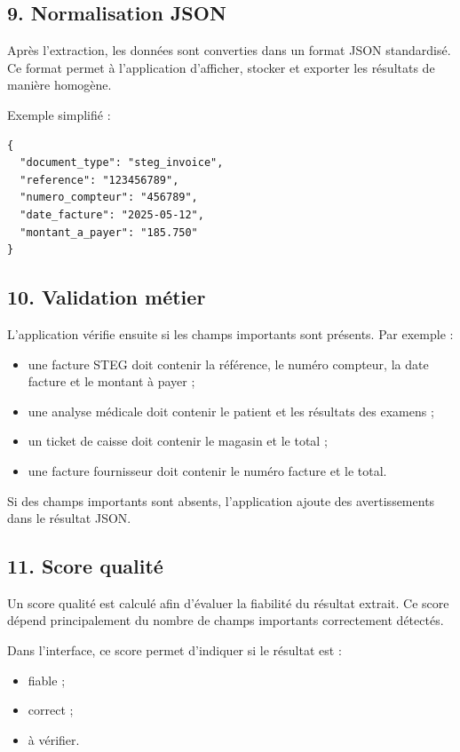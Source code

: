 \documentclass[12pt,a4paper]{report}
\begin{document}
\subsection*{9. Normalisation JSON}

Après l'extraction, les données sont converties dans un format JSON standardisé. Ce format permet à l'application d'afficher, stocker et exporter les résultats de manière homogène.

Exemple simplifié :

\begin{verbatim}
{
  "document_type": "steg_invoice",
  "reference": "123456789",
  "numero_compteur": "456789",
  "date_facture": "2025-05-12",
  "montant_a_payer": "185.750"
}
\end{verbatim}

\subsection*{10. Validation métier}

L'application vérifie ensuite si les champs importants sont présents. Par exemple :

\begin{itemize}
    \item une facture STEG doit contenir la référence, le numéro compteur, la date facture et le montant à payer ;
    \item une analyse médicale doit contenir le patient et les résultats des examens ;
    \item un ticket de caisse doit contenir le magasin et le total ;
    \item une facture fournisseur doit contenir le numéro facture et le total.
\end{itemize}

Si des champs importants sont absents, l'application ajoute des avertissements dans le résultat JSON.

\subsection*{11. Score qualité}

Un score qualité est calculé afin d'évaluer la fiabilité du résultat extrait. Ce score dépend principalement du nombre de champs importants correctement détectés.

Dans l'interface, ce score permet d'indiquer si le résultat est :

\begin{itemize}
    \item fiable ;
    \item correct ;
    \item à vérifier.
\end{itemize}
\end{document}
